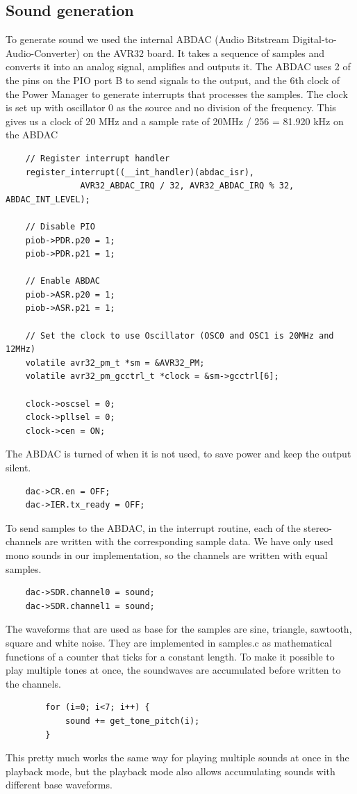 \subsection{Sound generation}
To generate sound we used the internal ABDAC (Audio Bitstream Digital-to-Audio-Converter) 
on the AVR32 board. It takes a sequence of samples and converts it into an analog 
signal, amplifies and outputs it.
The ABDAC uses 2 of the pins on the PIO port B to send signals to the output, and the 
6th clock of the Power Manager to generate interrupts that processes the samples. 
The clock is set up with oscillator 0 as the source and no division of the frequency. 
This gives us a clock of 20 MHz and a sample rate of 20MHz / 256 = 81.920 kHz on the ABDAC\\
\begin{lstlisting}
	// Register interrupt handler
	register_interrupt((__int_handler)(abdac_isr),
			   AVR32_ABDAC_IRQ / 32, AVR32_ABDAC_IRQ % 32, ABDAC_INT_LEVEL);

	// Disable PIO
	piob->PDR.p20 = 1;
	piob->PDR.p21 = 1;

	// Enable ABDAC
	piob->ASR.p20 = 1;
	piob->ASR.p21 = 1;

	// Set the clock to use Oscillator (OSC0 and OSC1 is 20MHz and 12MHz)
	volatile avr32_pm_t *sm = &AVR32_PM;
	volatile avr32_pm_gcctrl_t *clock = &sm->gcctrl[6];

	clock->oscsel = 0;
	clock->pllsel = 0;
	clock->cen = ON;
\end{lstlisting}
The ABDAC is turned of when it is not used, to save power and keep the output silent.\\
\begin{lstlisting}
	dac->CR.en = OFF;
	dac->IER.tx_ready = OFF;
\end{lstlisting}
To send samples to the ABDAC, in the interrupt routine, each of the stereo-channels are written with the corresponding sample data. We have only used mono sounds in our implementation, so the channels are written with equal samples.\\
\begin{lstlisting}
	dac->SDR.channel0 = sound;
	dac->SDR.channel1 = sound;
\end{lstlisting}
The waveforms that are used as base for the samples are sine, triangle, sawtooth, square and white noise. They are implemented in samples.c as mathematical functions of a counter that ticks for a constant length. To make it possible to play multiple tones at once, the soundwaves are accumulated before written to the channels.\\
\begin{lstlisting}
		for (i=0; i<7; i++) {
			sound += get_tone_pitch(i);
		}
\end{lstlisting}
This pretty much works the same way for playing multiple sounds at once in the playback mode, but the playback mode also allows accumulating sounds with different base waveforms.\\


